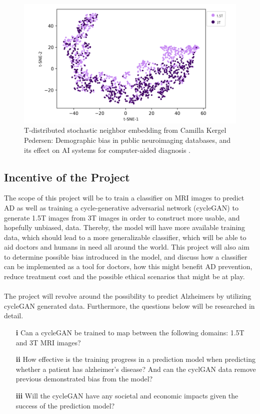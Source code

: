 \documentclass[12pt, fleqn, titlepage]{article}
\newcommand{\1}[1]{\mathds{1}\left[#1\right]}
\begin{document}
\begin{figure}[H]
	\centering
	\includegraphics[width=0.6\linewidth]{imgs/camilla_tsne}
	\caption{T-distributed stochastic neighbor embedding from Camilla Kergel Pedersen: Demographic bias in public neuroimaging databases, and its
		effect on AI systems for computer-aided diagnosis \cite{CamillaKandidat}.}
	\label{fig:camillatsne}
\end{figure}

\subsection{Incentive of the Project}
The scope of this project will be to train a classifier on MRI images to predict AD as well as training a cycle-generative adversarial network (cycleGAN)
to generate 1.5T images from 3T images in order to construct more usable, and
hopefully unbiased, data. Thereby, the model will have more available training
data, which should lead to a more generalizable classifier, which will be able to aid doctors and humans in need all around the world. This project will also aim to determine possible bias introduced in the model, and discuss how a classifier can be implemented as a tool for doctors, how this might benefit AD prevention, reduce treatment cost and the possible ethical scenarios that might be at play.
\\\\
The project will revolve around the possibility to predict Alzheimers by utilizing cycleGAN generated data. Furthermore, the questions below will be researched in detail.

\begin{itemize}
	\item[\textbf{i}] Can a cycleGAN be trained to map between the following domains: 1.5T and 3T MRI
	images?
	
	\item[\textbf{ii}] How effective is the training progress in a prediction model when predicting whether a patient has
	alzheimer’s disease? And can the cyclGAN data remove previous demonstrated bias from the model?
	
	\item[\textbf{iii}] Will the cycleGAN have any societal and economic impacts
	given the success of the prediction model?
	
\end{itemize}
\end{document}
